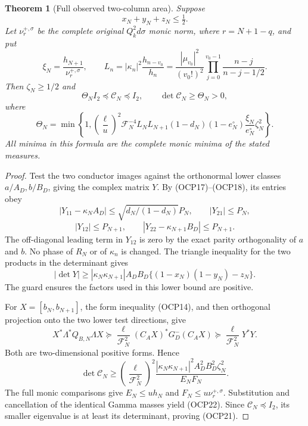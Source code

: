 \documentclass[10pt]{article}
\newtheorem{theorem}{Theorem}[section]
\begin{document}
\begin{theorem}[Full observed two-column area]
Suppose
\[
 x_N+y_N+z_N\le\tfrac12.
 \tag{OCP19}
\]
Let $\nu_r^{+,\sigma}$ be the complete original $Q_k^2d\sigma$ monic norm, where $r=N+1-q$, and put
\[
 \xi_N=\frac{h_{N+1}}{\nu_r^{+,\sigma}},\qquad
 L_n=|\kappa_n|^2\frac{h_{n-v_0}}{h_n}
 =\frac{|\mu_{v_0}|^2}{(v_0!)^2}
 \prod_{j=0}^{v_0-1}\frac{n-j}{n-j-1/2}.
 \tag{OCP20}
\]
Then $\zeta_N\ge1/2$ and
\[
 \boxed{\Theta_N I_2\preceq\mathcal C_N\preceq I_2,\qquad
 \det\mathcal C_N\ge\Theta_N>0,}
 \tag{OCP21}
\]
where
\[
 \boxed{\Theta_N=\min\left\{1,
 \left(\frac\ell u\right)^2\mathcal F_N^{-4}
 L_NL_{N+1}(1-d_N)(1-e_N^{\circ})
 \frac{\xi_N}{e_N^{\circ}}\zeta_N^2\right\}.}
 \tag{OCP22}
\]
All minima in this formula are the complete monic minima of the stated measures.
\end{theorem}
\begin{proof}
Test the two conductor images against the orthonormal lower classes $a/A_D,b/B_D$, giving the complex matrix $Y$. By (OCP17)--(OCP18), its entries obey
\[
 |Y_{11}-\kappa_NA_D|\le\sqrt{d_N/(1-d_N)}P_N,
 \qquad |Y_{21}|\le P_N,
\]
\[
 |Y_{12}|\le P_{N+1},\qquad
 |Y_{22}-\kappa_{N+1}B_D|\le P_{N+1}.
\]
The off-diagonal leading term in $Y_{12}$ is zero by the exact parity orthogonality of $a$ and $b$. No phase of $R_N$ or of $\kappa_n$ is changed. The triangle inequality for the two products in the determinant gives
\[
 |\det Y|\ge
 |\kappa_N\kappa_{N+1}|A_DB_D
 \{(1-x_N)(1-y_N)-z_N\}.
 \tag{OCP23}
\]
The guard ensures the factors used in this lower bound are positive.

For $X=[b_N,b_{N+1}]$, the form inequality (OCP14), and then orthogonal projection onto the two lower test directions, give
\[
 X^*\Lambda^*Q_{B,N}\Lambda X
 \succeq\frac\ell{\mathcal F_N^2}(C_AX)^*G^-_D(C_AX)
 \succeq\frac\ell{\mathcal F_N^2}Y^*Y.
\]
Both are two-dimensional positive forms. Hence
\[
 \det\mathcal C_N\ge
 \left(\frac\ell{\mathcal F_N^2}\right)^2
 \frac{|\kappa_N\kappa_{N+1}|^2A_D^2B_D^2\zeta_N^2}{E_NF_N}.
\]
The full monic comparisons give $E_N\le u h_N$ and $F_N\le u\nu_r^{+,\sigma}$. Substitution and cancellation of the identical Gamma masses yield (OCP22). Since $\mathcal C_N\preceq I_2$, its smaller eigenvalue is at least its determinant, proving (OCP21).
\end{proof}
\end{document}
